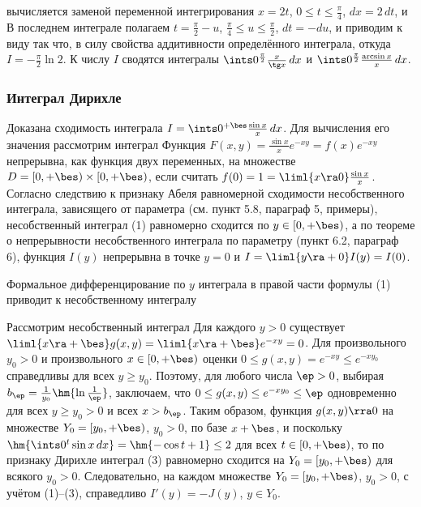 \documentclass[a4paper]{article}
\begin{document}
 вычисляется заменой
переменной интегрирования $x=2t$, $0\le t \le \frac{\pi}4$,
$dx=2\,dt$, и  В последнем интеграле полагаем
$t=\frac{\pi}2 - u$, $\frac{\pi}4 \le u \le \frac{\pi}2$, $dt=-du$,
и приводим к виду  так что, в силу
свойства аддитивности определённого интеграла,  откуда $I=-\frac{\pi}2\ln2$. К числу $I$ сводятся
интегралы $\ints0^{\frac{\pi}2} \frac{x}{\tg x}\,dx$ и
$\ints0^{\frac{\pi}2} \frac{\arcsin x}x\,dx$.

\subsubsection{Интеграл Дирихле}

Доказана сходимость интеграла $I=\ints0^{+\bes} \frac{\sin x}x\,dx$.
Для вычисления его значения рассмотрим интеграл  Функция $F(x,y) =
\frac{\sin x}x e^{-xy} = f(x)e^{-xy}$ непрерывна, как функция двух
переменных, на множестве $D=[0,+\bes) \times [0,+\bes)$, если
считать $f(0) = 1 = \liml{x\ra0} \frac{\sin x}x$. Согласно следствию
к признаку Абеля равномерной сходимости несобственного интеграла,
зависящего от параметра (см. пункт 5.8, параграф 5, примеры),
несобственный интеграл (1) равномерно сходится по $y\in[0,+\bes)$, а
по теореме о непрерывности несобственного интеграла по параметру
(пункт 6.2, параграф 6), функция $I(y)$ непрерывна в точке $y=0$ и
$I=\liml{y\ra+0} I(y)=I(0)$.

Формальное дифференцирование по $y$ интеграла в правой части формулы
(1) приводит к несобственному интегралу 

Рассмотрим несобственный интеграл  Для каждого $y>0$ существует $\liml{x\ra+\bes}
g(x,y) = \liml{x\ra+\bes} e^{-xy}=0$. Для произвольного $y_0>0$ и
произвольного $x\in[0,+\bes)$ оценки $0\le g(x,y) = e^{-xy} \le
e^{-xy_0}$ справедливы для всех $y\ge y_0$. Поэтому, для любого
числа $\ep>0$, выбирая $b_{\ep} = \frac1{y_0} \hm{\ln\frac1{\ep}}$,
заключаем, что $0\le g(x,y) \le e^{-xy_0}\le \ep$ одновременно для
всех $y\ge y_0 > 0$ и всех $x> b_{\ep}$. Таким образом, функция
$g(x,y)\rra0$ на множестве $Y_0 = [y_0,+\bes)$, $y_0>0$, по базе
$x+\bes$, и поскольку $\hm{\ints0^t \sin x\,dx} = \hm{-\cos
t+1}\le2$ для всех $t\in[0,+\bes)$, то по признаку Дирихле интеграл
(3) равномерно сходится на $Y_0 = [y_0,+\bes)$ для всякого $y_0>0$.
Следовательно, на каждом множестве $Y_0 = [y_0,+\bes)$, $y_0>0$, с
учётом (1)--(3), справедливо $I'(y) = -J(y)$, $y\in Y_0$.
\end{document}
